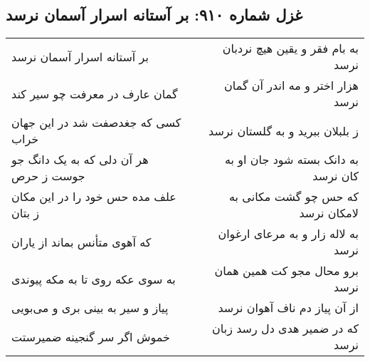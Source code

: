 \begin{center}
\section*{غزل شماره ۹۱۰: بر آستانه اسرار آسمان نرسد}
\label{sec:0910}
\begin{longtable}{l p{0.5cm} r}
بر آستانه اسرار آسمان نرسد
&&
به بام فقر و یقین هیچ نردبان نرسد
\\
گمان عارف در معرفت چو سیر کند
&&
هزار اختر و مه اندر آن گمان نرسد
\\
کسی که جغدصفت شد در این جهان خراب
&&
ز بلبلان ببرید و به گلستان نرسد
\\
هر آن دلی که به یک دانگ جو جوست ز حرص
&&
به دانک بسته شود جان او به کان نرسد
\\
علف مده حس خود را در این مکان ز بتان
&&
که حس چو گشت مکانی به لامکان نرسد
\\
که آهوی متأنس بماند از یاران
&&
به لاله زار و به مرعای ارغوان نرسد
\\
به سوی عکه روی تا به مکه پیوندی
&&
برو محال مجو کت همین همان نرسد
\\
پیاز و سیر به بینی بری و می‌بویی
&&
از آن پیاز دم ناف آهوان نرسد
\\
خموش اگر سر گنجینه ضمیرستت
&&
که در ضمیر هدی دل رسد زبان نرسد
\\
\end{longtable}
\end{center}
